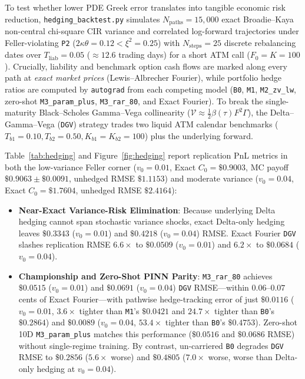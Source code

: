 \documentclass[preprint,12pt]{elsarticle}
\begin{document}
To test whether lower PDE Greek error translates into tangible economic risk reduction, \texttt{hedging\_backtest.py} simulates $N_{\mathrm{paths}} = 15{,}000$ exact Broadie--Kaya \cite{broadie2006exact} non-central chi-square CIR variance and correlated log-forward trajectories under Feller-violating \texttt{P2} ($2\kappa\theta = 0.12 < \xi^2 = 0.25$) with $N_{\mathrm{steps}} = 25$ discrete rebalancing dates over $T_{\mathrm{liab}} = 0.05$ ($\approx 12.6$ trading days) for a short ATM call ($F_0 = K = 100$). Crucially, liability and benchmark option cash flows are marked along every path at \emph{exact market prices} (Lewis--Albrecher Fourier), while portfolio hedge ratios are computed by \texttt{autograd} from each competing model (\texttt{B0}, \texttt{M1}, \texttt{M2\_zv\_lw}, zero-shot \texttt{M3\_param\_plus}, \texttt{M3\_rar\_80}, and Exact Fourier). To break the single-maturity Black--Scholes Gamma--Vega collinearity ($\mathcal{V} \approx \frac{1}{2}\beta(\tau)F^2\Gamma$), the Delta--Gamma--Vega (\texttt{DGV}) strategy trades two liquid ATM calendar benchmarks ($T_{b1} = 0.10, T_{b2} = 0.50, K_{b1} = K_{b2} = 100$) plus the underlying forward.

Table~\ref{tab:hedging} and Figure~\ref{fig:hedging} report replication PnL metrics in both the low-variance Feller corner ($v_0 = 0.01$, Exact $C_0 = \$0.9003$, MC payoff $\$0.9063 \pm \$0.0091$, unhedged RMSE $\$1.1153$) and moderate variance ($v_0 = 0.04$, Exact $C_0 = \$1.7604$, unhedged RMSE $\$2.4164$):
\begin{itemize}
  \item \textbf{Near-Exact Variance-Risk Elimination}: Because underlying Delta hedging cannot span stochastic variance shocks, exact Delta-only hedging leaves $\$0.3343$ ($v_0 = 0.01$) and $\$0.4218$ ($v_0 = 0.04$) RMSE. Exact Fourier \texttt{DGV} slashes replication RMSE $\mathbf{6.6\times}$ to $\mathbf{\$0.0509}$ ($v_0 = 0.01$) and $\mathbf{6.2\times}$ to $\mathbf{\$0.0684}$ ($v_0 = 0.04$).
  \item \textbf{Championship and Zero-Shot PINN Parity}: \texttt{M3\_rar\_80} achieves $\mathbf{\$0.0515}$ ($v_0 = 0.01$) and $\mathbf{\$0.0691}$ ($v_0 = 0.04$) \texttt{DGV} RMSE---within $\mathbf{0.06\text{--}0.07}$ cents of Exact Fourier---with pathwise hedge-tracking error of just $\$0.0116$ ($v_0 = 0.01$, $\mathbf{3.6\times}$ tighter than \texttt{M1}'s $\$0.0421$ and $\mathbf{24.7\times}$ tighter than \texttt{B0}'s $\$0.2864$) and $\$0.0089$ ($v_0 = 0.04$, $\mathbf{53.4\times}$ tighter than \texttt{B0}'s $\$0.4753$). Zero-shot 10D \texttt{M3\_param\_plus} matches this performance ($\mathbf{\$0.0516}$ and $\mathbf{\$0.0686}$ RMSE) without single-regime training. By contrast, un-carriered \texttt{B0} degrades \texttt{DGV} RMSE to $\$0.2856$ ($5.6\times$ worse) and $\$0.4805$ ($7.0\times$ worse, worse than Delta-only hedging at $v_0 = 0.04$).
\end{itemize}
\end{document}
